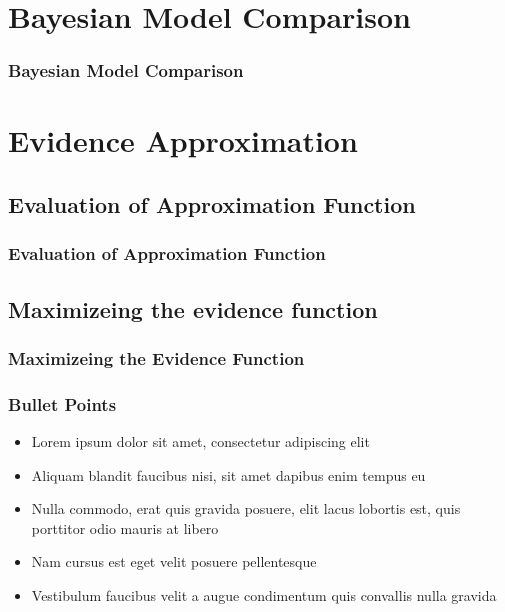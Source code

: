 \documentclass{beamer}
\begin{document}
\section{Bayesian Model Comparison}

\begin{frame}
\frametitle{Bayesian Model Comparison}

\end{frame}



\section{Evidence Approximation}

\subsection{Evaluation of Approximation Function}

\begin{frame}
\frametitle{Evaluation of Approximation Function}

\end{frame}

\subsection{Maximizeing the evidence function}

\begin{frame}
\frametitle{Maximizeing the Evidence Function}

\end{frame}


\begin{frame}
\frametitle{Bullet Points}
\begin{itemize}
\item Lorem ipsum dolor sit amet, consectetur adipiscing elit
\item Aliquam blandit faucibus nisi, sit amet dapibus enim tempus eu
\item Nulla commodo, erat quis gravida posuere, elit lacus lobortis est, quis porttitor odio mauris at libero
\item Nam cursus est eget velit posuere pellentesque
\item Vestibulum faucibus velit a augue condimentum quis convallis nulla gravida
\end{itemize}
\end{frame}
\end{document}
